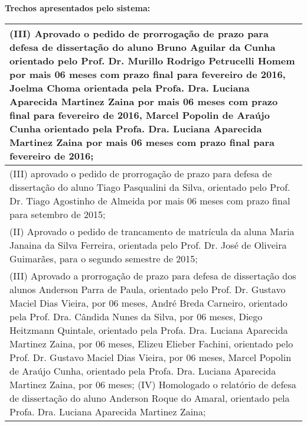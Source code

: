 \noindent
\textbf{Trechos apresentados pelo sistema:}
\begin{longtable}{|p{17.5cm}|}
\hline 
(III) Aprovado o pedido de prorrogação de prazo para defesa de dissertação do aluno Bruno Aguilar da Cunha orientado pelo Prof. Dr. Murillo Rodrigo Petrucelli Homem por mais 06 meses com prazo final para fevereiro de 2016, Joelma Choma orientada pela Profa. Dra. Luciana Aparecida Martinez Zaina por mais 06 meses com prazo final para fevereiro de 2016, Marcel Popolin de Araújo Cunha orientado pela Profa. Dra. Luciana Aparecida Martinez Zaina por mais 06 meses com prazo final para fevereiro de 2016;

 \\ \hline 
(III) aprovado o pedido de prorrogação de prazo para defesa de dissertação do aluno Tiago Pasqualini da Silva, orientado pelo Prof. Dr. Tiago Agostinho de Almeida por mais 06 meses com prazo final para setembro de 2015;

 \\ \hline 
(II) Aprovado o pedido de trancamento de matrícula da aluna Maria Janaina da Silva Ferreira, orientada pelo Prof. Dr. José de Oliveira Guimarães, para o segundo semestre de 2015;

 \\ \hline 
(III) Aprovado a prorrogação de prazo para defesa de dissertação dos alunos Anderson Parra de Paula, orientado pelo Prof. Dr. Gustavo Maciel Dias Vieira, por 06 meses, André Breda Carneiro, orientado pela Prof. Dra. Cândida Nunes da Silva, por 06 meses, Diego Heitzmann Quintale, orientado pela Profa. Dra. Luciana Aparecida Martinez Zaina, por 06 meses, Elizeu Elieber Fachini, orientado pelo Prof. Dr. Gustavo Maciel Dias Vieira, por 06 meses, Marcel Popolin de Araújo Cunha, orientado pela Profa. Dra. Luciana Aparecida Martinez Zaina, por 06 meses; (IV) Homologado o relatório de defesa de dissertação do aluno Anderson Roque do Amaral, orientado pela Profa. Dra. Luciana Aparecida Martinez Zaina;


\end{longtable}
